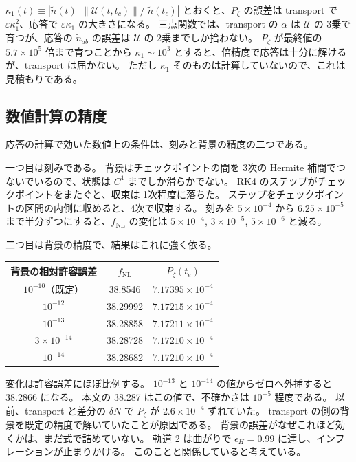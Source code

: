 \documentclass[a4paper,11pt]{ltjsarticle}
\newcommand{\fnl}{f_{\mathrm{NL}}}
\begin{document}
$\kappa_1(t)\equiv|\tilde n(t)|\,\|\mathcal U(t,t_c)\|/|\tilde n(t_c)|$ とおくと、$P_\zeta$ の誤差は transport で $\varepsilon\kappa_1^2$、応答で $\varepsilon\kappa_1$ の大きさになる。
三点関数では、transport の $\alpha$ は $\mathcal U$ の 3乗で育つが、応答の $\tilde n_{ab}$ の誤差は $\mathcal U$ の 2乗までしか拾わない。
$P_\zeta$ が最終値の $5.7\times10^5$ 倍まで育つことから $\kappa_1\sim10^3$ とすると、倍精度で応答は十分に解けるが、transport は届かない。
ただし $\kappa_1$ そのものは計算していないので、これは見積もりである。

\subsection{数値計算の精度}
\label{app:numerical-precision}

応答の計算で効いた数値上の条件は、刻みと背景の精度の二つである。

一つ目は刻みである。
背景はチェックポイントの間を 3次の Hermite 補間でつないでいるので、状態は $C^1$ までしか滑らかでない。
RK4 のステップがチェックポイントをまたぐと、収束は 1次程度に落ちた。
ステップをチェックポイントの区間の内側に収めると、4次で収束する。
刻みを $5\times10^{-4}$ から $6.25\times10^{-5}$ まで半分ずつにすると、$\fnl$ の変化は $5\times10^{-4}$, $3\times10^{-5}$, $5\times10^{-6}$ と減る。

二つ目は背景の精度で、結果はこれに強く依る。
\begin{center}
\begin{tabular}{ccc}
\toprule
背景の相対許容誤差 & $\fnl$ & $P_\zeta(t_e)$ \\
\midrule
$10^{-10}$（既定） & 38.8546 & $7.17395\times10^{-4}$ \\
$10^{-12}$ & 38.29992 & $7.17215\times10^{-4}$ \\
$10^{-13}$ & 38.28858 & $7.17211\times10^{-4}$ \\
$3\times10^{-14}$ & 38.28728 & $7.17210\times10^{-4}$ \\
$10^{-14}$ & 38.28682 & $7.17210\times10^{-4}$ \\
\bottomrule
\end{tabular}
\end{center}
変化は許容誤差にほぼ比例する。
$10^{-13}$ と $10^{-14}$ の値からゼロへ外挿すると 38.2866 になる。
本文の 38.287 はこの値で、不確かさは $10^{-5}$ 程度である。
以前、transport と差分の $\delta N$ で $P_\zeta$ が $2.6\times10^{-4}$ ずれていた。
transport の側の背景を既定の精度で解いていたことが原因である。
背景の誤差がなぜこれほど効くかは、まだ式で詰めていない。
軌道 2 は曲がりで $\epsilon_H=0.99$ に達し、インフレーションが止まりかける。
このことと関係していると考えている。
\end{document}

